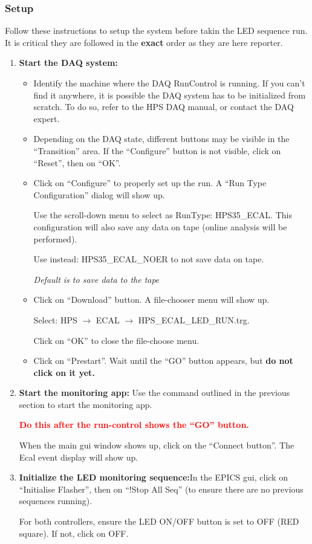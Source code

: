 \documentclass[12pt]{article}
\begin{document}
\subsubsection{Setup}
Follow these instructions to setup the system before takin the LED sequence run.
It is critical they are followed in the \textbf{exact} order as they are here reporter.

\begin{enumerate}
\item{\textbf{Start the DAQ system: }
\begin{itemize}
\item Identify the machine where the DAQ RunControl is running. If you can't find it anywhere, it is possible the DAQ system has to be initialized from scratch. To do so, refer to the HPS DAQ manual, or contact the DAQ expert.
\item Depending on the DAQ state, different buttons may be visible in the ``Transition'' area. If the ``Configure'' button is not visible, click on ``Reset'', then on ``OK''.
\item Click on ``Configure'' to properly set up the run.
A ``Run Type Configuration'' dialog will show up.

Use the scroll-down menu to select as RunType: HPS35\_ECAL. This configuration will also save any data on tape (online analysis will be performed).

Use instead: HPS35\_ECAL\_NOER to not save data on tape.

\textit{Default is to save data to the tape}
\item{Click on ``Download'' button. A file-chooser menu will show up.

Select: HPS $\rightarrow$ ECAL $\rightarrow$  HPS\_ECAL\_LED\_RUN.trg. 

Click on ``OK'' to close the file-choose menu.
}
\item{Click on ``Prestart''.  Wait until the ``GO'' button appears, but {\bf do not click on it yet.}

 }
\end{itemize}
}
\item{\textbf{Start the monitoring app: }Use the command outlined in the previous section to start the monitoring app.

\textcolor{red}{\bf Do this after the run-control shows the ``GO'' button.}

When the main gui window shows up, click on the ``Connect button''. The Ecal event display will show up.}
\item{\textbf{Initialize the LED monitoring sequence:}In the EPICS gui, click on ``Initialise Flasher'', then on ``!Stop All Seq'' (to ensure there are no previous sequences running). 

For both controllers, ensure the LED ON/OFF button is set to OFF (RED square). If not, click on OFF.}
\end{enumerate}
      
\end{document}
